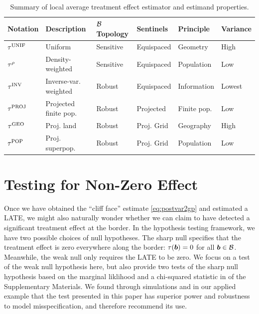 \begin{table}[tbp]
    \centering
    \bgroup
    \def\arraystretch{1.1}%
    \begin{tabular}{llllll}
        \hline
        Notation   & Description           & \(\mathcal{B}\) Topology & Sentinels & Principle & Variance \\
        \hline
        \(\tau^{\mathrm{UNIF}}\) & Uniform               & Sensitive & Equispaced      & Geometry    & High     \\
        \(\tau^{\rho}\)  & Density-weighted      & Sensitive & Equispaced      & Population  & Low      \\
        \(\tau^{\mathrm{INV}}\)  & Inverse-var. weighted & Robust    & Equispaced      & Information & Lowest   \\
        \(\tau^{\mathrm{PROJ}}\) & Projected finite pop. & Robust    & Projected       & Finite pop. & Low      \\
        \(\tau^{\mathrm{GEO}}\)  & Proj. land            & Robust    & Proj. Grid  & Geography   & High     \\
        \(\tau^{\mathrm{POP}}\)  & Proj. superpop.       & Robust    & Proj. Grid  & Population  & Low \\
        \hline
    \end{tabular}
    \egroup
    \caption{
    \label{table:estimator_properties}
    Summary of local average treatment effect estimator and estimand properties.}
\end{table}

\section{Testing for Non-Zero Effect}
\label{sec:hypothesis_testing}
Once we have obtained the ``cliff face'' estimate \autoref{eq:postvar2gp} and estimated a LATE, we might also naturally wonder whether we can claim to have detected a significant treatment effect at the border.
In the hypothesis testing framework, we have two possible choices of null hypotheses.
The sharp null specifies that the treatment effect is zero everywhere along the border:
\(\tau(\bm{b})=0\) for all \(\bm{b} \in \mathcal{B}\).
Meanwhile, the weak null only requires the LATE to be zero.
We focus on a test of the weak null hypothesis here, but also provide two tests of the sharp null hypothesis based on the marginal liklihood and a chi-squared statistic in  of the Supplementary Materials.
We found through simulations and in our applied example that the test presented in this paper has superior power and robustness to model misspecification, and therefore recommend its use.


